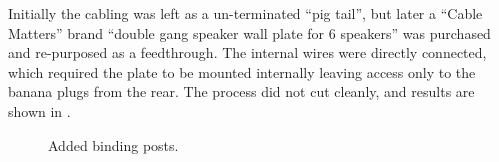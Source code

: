 %
Initially the cabling was left as a un-terminated “pig tail”, but later a “Cable Matters” brand “double gang speaker wall plate for 6 speakers” was purchased and re-purposed as a feedthrough. The internal wires were directly connected, which required the plate to be mounted internally leaving access only to the banana plugs from the rear. The process did not cut cleanly, and results are shown in .\par
%
\begin{figure}[h!]
\centering
{}
\qquad
{}
\caption{Added binding posts.}
\label{fig:sp_binding_posts}
\end{figure}
